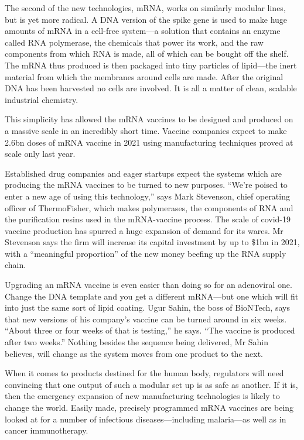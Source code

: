 \documentclass{article}
\begin{document}
The second of the new technologies, mRNA, works on similarly modular lines, but is yet more radical. A DNA version of the spike gene is used to make huge amounts of mRNA in a cell-free system---a solution that contains an enzyme called RNA polymerase, the chemicals that power its work, and the raw components from which RNA is made, all of which can be bought off the shelf. The mRNA thus produced is then packaged into tiny particles of lipid---the inert material from which the membranes around cells are made. After the original DNA has been harvested no cells are involved. It is all a matter of clean, scalable industrial chemistry. 

This simplicity has allowed the mRNA vaccines to be designed and produced on a massive scale in an incredibly short time. Vaccine companies expect to make 2.6bn doses of mRNA vaccine in 2021 using manufacturing techniques proved at scale only last year. 

Established drug companies and eager startups expect the systems which are producing the mRNA vaccines to be turned to new purposes. ``We're poised to enter a new age of using this technology,'' says Mark Stevenson, chief operating officer of ThermoFisher, which makes polymerases, the components of RNA and the purification resins used in the mRNA-vaccine process. The scale of covid-19 vaccine production has spurred a huge expansion of demand for its wares. Mr Stevenson says the firm will increase its capital investment by up to \$1bn in 2021, with a ``meaningful proportion'' of the new money beefing up the RNA supply chain. 

Upgrading an mRNA vaccine is even easier than doing so for an adenoviral one. Change the DNA template and you get a different mRNA---but one which will fit into just the same sort of lipid coating. Ugur Sahin, the boss of BioNTech, says that new versions of his company's vaccine can be turned around in six weeks. ``About three or four weeks of that is testing,'' he says. ``The vaccine is produced after two weeks.'' Nothing besides the sequence being delivered, Mr Sahin believes, will change as the system moves from one product to the next. 

When it comes to products destined for the human body, regulators will need convincing that one output of such a modular set up is as safe as another. If it is, then the emergency expansion of new manufacturing technologies is likely to change the world. Easily made, precisely programmed mRNA vaccines are being looked at for a number of infectious diseases---including malaria---as well as in cancer immunotherapy. 
\end{document}
